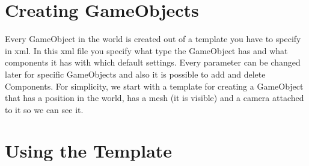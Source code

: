 \documentclass{article}
\begin{document}
\section{Creating GameObjects}

Every GameObject in the world is created out of a template you have to specify in xml. In this xml file you specify what type the GameObject has and what components it has with which default settings. Every parameter can be changed later for specific GameObjects and also it is possible to add and delete Components. For simplicity, we start with a template for creating a GameObject that has a position in the world, has a mesh (it is visible) and a camera attached to it so we can see it.


\section{Using the Template}
\end{document}
